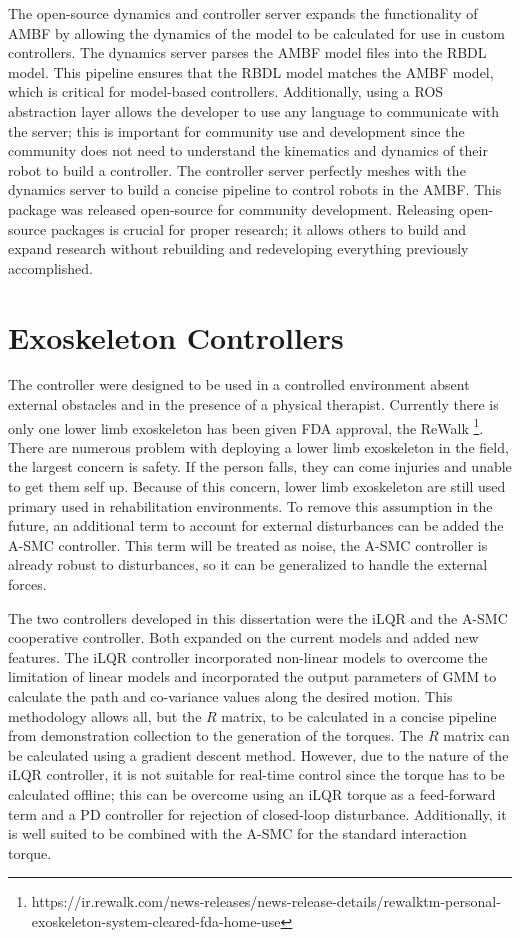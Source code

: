 The open-source dynamics and controller server expands the functionality of AMBF by allowing the dynamics of the model to be calculated for use in custom controllers. The dynamics server parses the AMBF model files into the RBDL model. This pipeline ensures that the RBDL model matches the AMBF model, which is critical for model-based controllers. Additionally, using a ROS abstraction layer allows the developer to use any language to communicate with the server; this is important for community use and development since the community does not need to understand the kinematics and dynamics of their robot to build a controller. The controller server perfectly meshes with the dynamics server to build a concise pipeline to control robots in the AMBF. This package was released open-source for community development. Releasing open-source packages is crucial for proper research; it allows others to build and expand research without rebuilding and redeveloping everything previously accomplished.   


\section{Exoskeleton Controllers}

The controller were designed to be used in a controlled environment absent external obstacles and in the presence of a physical therapist.  Currently there is only one lower limb exoskeleton has been given FDA approval, the ReWalk \footnote{https://ir.rewalk.com/news-releases/news-release-details/rewalktm-personal-exoskeleton-system-cleared-fda-home-use}. There are numerous problem with deploying a lower limb exoskeleton in the field, the largest concern is safety. If the person falls, they can come injuries and unable to get them self up. Because of this concern, lower limb exoskeleton are still used primary used in rehabilitation environments. To remove this assumption in the future, an additional term to account for external disturbances can be added the A-SMC controller. This term will be treated as noise, the A-SMC controller is already robust to disturbances, so it can be generalized to handle the external forces. 

The two controllers developed in this dissertation were the iLQR and the A-SMC cooperative controller. Both expanded on the current models and added new features. The iLQR controller incorporated non-linear models to overcome the limitation of linear models and incorporated the output parameters of GMM to calculate the path and co-variance values along the desired motion. This methodology allows all, but the $R$ matrix, to be calculated in a concise pipeline from demonstration collection to the generation of the torques. The $R$ matrix can be calculated using a gradient descent method. However, due to the nature of the iLQR controller, it is not suitable for real-time control since the torque has to be calculated offline; this can be overcome using an iLQR torque as a feed-forward term and a PD controller for rejection of closed-loop disturbance. Additionally, it is well suited to be combined with the A-SMC for the standard interaction torque. 

